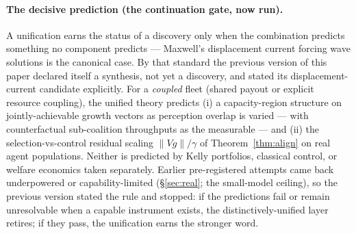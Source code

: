 \documentclass[11pt]{article}
\theoremstyle{plain}
\theoremstyle{definition}
\theoremstyle{remark}
\begin{document}
\paragraph{The decisive prediction (the continuation gate, now run).} A unification earns the status of a
discovery only when the combination predicts something no component predicts --- Maxwell's displacement current
forcing wave solutions is the canonical case. By that standard the previous version of this paper declared
itself a synthesis, not yet a discovery, and stated its displacement-current candidate explicitly. For a
\emph{coupled} fleet (shared payout or explicit resource coupling), the unified theory predicts (i) a
capacity-region structure on jointly-achievable growth vectors as perception overlap is varied --- with
counterfactual sub-coalition throughputs as the measurable --- and (ii) the selection-vs-control residual
scaling $\|Vg\|/\gamma$ of Theorem~\ref{thm:align} on real agent populations. Neither is predicted by Kelly
portfolios, classical control, or welfare economics taken separately. Earlier pre-registered attempts came back
underpowered or capability-limited (\S\ref{sec:real}; the small-model ceiling), so the previous version stated
the rule and stopped: if the predictions fail or remain unresolvable when a capable instrument exists, the
distinctively-unified layer retires; if they pass, the unification earns the stronger word.
\end{document}
